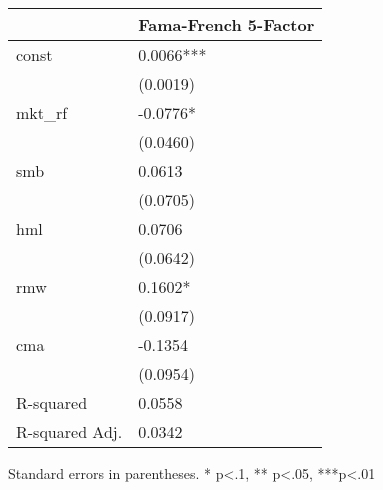\begin{table}
\caption{}
\label{}
\begin{center}
\begin{tabular}{ll}
\hline
               & Fama-French 5-Factor  \\
\hline
const          & 0.0066***             \\
               & (0.0019)              \\
mkt\_rf        & -0.0776*              \\
               & (0.0460)              \\
smb            & 0.0613                \\
               & (0.0705)              \\
hml            & 0.0706                \\
               & (0.0642)              \\
rmw            & 0.1602*               \\
               & (0.0917)              \\
cma            & -0.1354               \\
               & (0.0954)              \\
R-squared      & 0.0558                \\
R-squared Adj. & 0.0342                \\
\hline
\end{tabular}
\end{center}
\end{table}
\bigskip
Standard errors in parentheses. \newline 
* p<.1, ** p<.05, ***p<.01